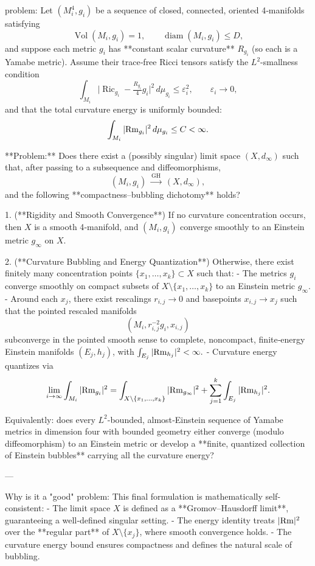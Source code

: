 problem:  
Let \((M_i^4,g_i)\) be a sequence of closed, connected, oriented 4‑manifolds satisfying  
\[
\operatorname{Vol}(M_i,g_i)=1,\qquad \operatorname{diam}(M_i,g_i)\le D,
\]  
and suppose each metric \(g_i\) has **constant scalar curvature** \(R_{g_i}\) (so each is a Yamabe metric).  
Assume their trace‑free Ricci tensors satisfy the \(L^2\)-smallness condition  
\[
\int_{M_i}\Big|\operatorname{Ric}_{g_i} - \tfrac{R_{g_i}}{4}g_i\Big|^2\,d\mu_{g_i} \le \varepsilon_i^2,\qquad \varepsilon_i\to0,  
\]
and that the total curvature energy is uniformly bounded:
\[
\int_{M_i} |{\rm Rm}_{g_i}|^2\,d\mu_{g_i}\le C<\infty.
\]

**Problem:**  
Does there exist a (possibly singular) limit space \((X,d_\infty)\) such that, after passing to a subsequence and diffeomorphisms,
\[
(M_i,g_i) \;\xrightarrow{\mathrm{GH}}\; (X,d_\infty),
\]
and the following **compactness–bubbling dichotomy** holds?  

1. (**Rigidity and Smooth Convergence**)  
If no curvature concentration occurs, then \(X\) is a smooth 4‑manifold, and \((M_i,g_i)\) converge smoothly to an Einstein metric \(g_\infty\) on \(X\).  

2. (**Curvature Bubbling and Energy Quantization**)  
Otherwise, there exist finitely many concentration points \(\{x_1,\dots,x_k\}\subset X\) such that:
   - The metrics \(g_i\) converge smoothly on compact subsets of \(X\setminus\{x_1,\dots,x_k\}\) to an Einstein metric \(g_\infty\).
   - Around each \(x_j\), there exist rescalings \(r_{i,j}\to0\) and basepoints \(x_{i,j}\to x_j\) such that the pointed rescaled manifolds
     \[
     (M_i, r_{i,j}^{-2} g_i, x_{i,j})
     \]
     subconverge in the pointed smooth sense to complete, noncompact, finite‑energy Einstein manifolds \((E_j,h_j)\), with  
     \(\int_{E_j} |{\rm Rm}_{h_j}|^2 <\infty.\)
   - Curvature energy quantizes via
     \[
     \lim_{i\to\infty}\int_{M_i}|{\rm Rm}_{g_i}|^2
     = \int_{X\setminus\{x_1,\dots,x_k\}}|{\rm Rm}_{g_\infty}|^2
       + \sum_{j=1}^k \int_{E_j}|{\rm Rm}_{h_j}|^2.
     \]

Equivalently: does every \(L^2\)-bounded, almost‑Einstein sequence of Yamabe metrics in dimension four with bounded geometry either converge (modulo diffeomorphism) to an Einstein metric or develop a **finite, quantized collection of Einstein bubbles** carrying all the curvature energy?

---

Why is it a "good" problem:  
This final formulation is mathematically self-consistent:  
- The limit space \(X\) is defined as a **Gromov–Hausdorff limit**, guaranteeing a well‑defined singular setting.  
- The energy identity treats \(|{\rm Rm}|^2\) over the **regular part** of \(X\setminus\{x_j\}\), where smooth convergence holds.  
- The curvature energy bound ensures compactness and defines the natural scale of bubbling.  

